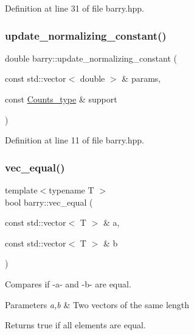 Definition at line 31 of file barry.\+hpp.

\mbox{\label{namespacebarry_a822db820c95822d0e7a51728d9b9858d}} 
\subsubsection{\texorpdfstring{update\+\_\+normalizing\+\_\+constant()}{update\_normalizing\_constant()}}
{\footnotesize\ttfamily double barry\+::update\+\_\+normalizing\+\_\+constant (\begin{DoxyParamCaption}\item[{const std\+::vector$<$ double $>$ \&}]{params,  }\item[{const \hyperlink{namespacebarry_a3e2d8c3b6cf602107559d4237d9f1315}{Counts\+\_\+type} \&}]{support }\end{DoxyParamCaption})\hspace{0.3cm}{\ttfamily [inline]}}



Definition at line 11 of file barry.\+hpp.

\mbox{\label{namespacebarry_afbdb85734a7793890ea4268ea114858e}} 
\subsubsection{\texorpdfstring{vec\+\_\+equal()}{vec\_equal()}}
{\footnotesize\ttfamily template$<$typename T $>$ \\
bool barry\+::vec\+\_\+equal (\begin{DoxyParamCaption}\item[{const std\+::vector$<$ T $>$ \&}]{a,  }\item[{const std\+::vector$<$ T $>$ \&}]{b }\end{DoxyParamCaption})\hspace{0.3cm}{\ttfamily [inline]}}



Compares if -\/a-\/ and -\/b-\/ are equal. 


\begin{DoxyParams}{Parameters}
{\em a,b} & Two vectors of the same length \\
\hline
\end{DoxyParams}
\begin{DoxyReturn}{Returns}
{\ttfamily true} if all elements are equal. 
\end{DoxyReturn}


